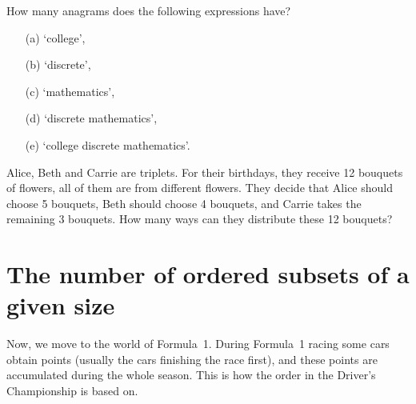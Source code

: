 \begin{exercise}\label{ex:anagrams1}
How many anagrams does the following expressions have? 
\begin{enumerate}
\item[(a)]
`college', 
\item[(b)]
`discrete',
\item[(c)]
`mathematics',
\item[(d)]
`discrete mathematics',
\item[(e)]
`college discrete mathematics'.
\end{enumerate}
\end{exercise}

%
%
%

\begin{exercise}\label{ex:anagrams2}
Alice, Beth and Carrie are triplets. 
For their birthdays, 
they receive 12 bouquets of flowers, 
all of them are from different flowers. 
They decide that Alice should choose 5 bouquets, 
Beth should choose 4 bouquets, and Carrie takes the remaining 3 bouquets. 
How many ways can they distribute these 12 bouquets? 
\end{exercise}








\section{The number of ordered subsets of a given size}\label{sec:orderedsubsets}

Now, 
we move to the world of Formula~1. 
During Formula~1 racing some cars obtain points (usually the cars finishing the race first), 
and these points are accumulated during the whole season. 
This is how the order in the Driver's Championship is based on. 

